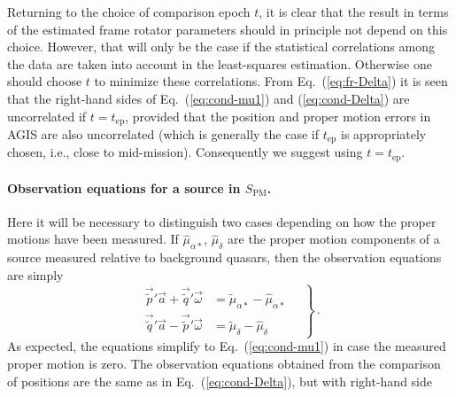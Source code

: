 \documentclass[structabstract]{aa}
\begin{document}
Returning to the choice of comparison epoch $t$, it is clear that the result 
in terms of the estimated frame rotator parameters should in principle 
not depend on this choice. However, that will only be the case if the 
statistical correlations among the data are taken into account in the 
least-squares estimation. Otherwise one should choose $t$ to minimize 
these correlations. From Eq.~(\ref{eq:fr-Delta}) it is seen that the right-hand
sides of Eq.~(\ref{eq:cond-mu1}) and (\ref{eq:cond-Delta}) are uncorrelated
if $t=t_\text{ep}$, provided that the position and proper motion errors in
AGIS are also uncorrelated (which is generally the case if $t_\text{ep}$ is
appropriately chosen, i.e., close to mid-mission). Consequently we 
suggest using $t=t_\text{ep}$.

\paragraph{Observation equations for a source in $S_\text{PM}$.}
Here it will be necessary to distinguish two cases depending on how 
the proper motions have been measured.
If $\hat{\mu}_{\alpha*}$, $\hat{\mu}_{\delta}$ are the proper motion
components of a source measured relative to background quasars, then
the observation equations are simply
\begin{equation}\label{eq:cond-mu2}
\left.
\begin{aligned}
\vec{\tilde{p}}'\vec{a} + \vec{\tilde{q}}'\vec{\omega} &= \tilde{\mu}_{\alpha*}
- \hat{\mu}_{\alpha*}\\[3pt]
\vec{\tilde{q}}'\vec{a} - \vec{\tilde{p}}'\vec{\omega} &= \tilde{\mu}_{\delta}
-\hat{\mu}_{\delta}
\end{aligned}
\quad\right\} \, .
\end{equation}
As expected, the equations simplify to Eq.~(\ref{eq:cond-mu1}) in case the 
measured proper motion is zero. The observation equations obtained from
the comparison of positions are the same as in Eq.~(\ref{eq:cond-Delta}),
but with right-hand side
\end{document}

